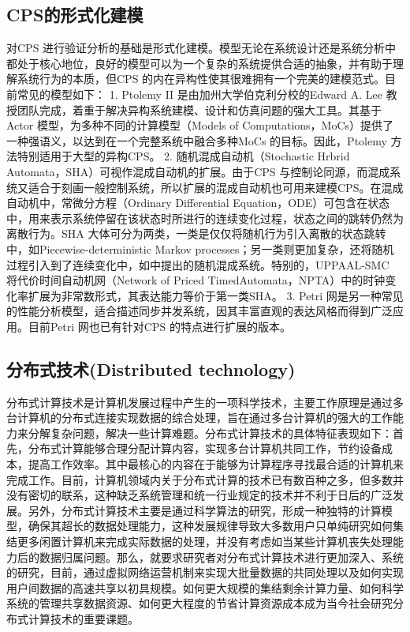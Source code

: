 \subsection{CPS的形式化建模}
对CPS 进行验证分析的基础是形式化建模。模型无论在系统设计还是系统分析中都处于核心地位，良好的模型可以为一个复杂的系统提供合适的抽象，并有助于理解系统行为的本质，但CPS 的内在异构性使其很难拥有一个完美的建模范式。目前常见的模型如下：
1.	Ptolemy II 是由加州大学伯克利分校的Edward A. Lee 教授团队完成，着重于解决异构系统建模、设计和仿真问题的强大工具。其基于Actor 模型，为多种不同的计算模型（Models of Computations，MoCs）提供了一种强语义，以达到在一个完整系统中融合多种MoCs 的目标。因此，Ptolemy 方法特别适用于大型的异构CPS。
2.	随机混成自动机（Stochastic Hrbrid Automata，SHA）可视作混成自动机的扩展。由于CPS 与控制论同源，而混成系统又适合于刻画一般控制系统，所以扩展的混成自动机也可用来建模CPS。在混成自动机中，常微分方程（Ordinary Differential Equation，ODE）可包含在状态中，用来表示系统停留在该状态时所进行的连续变化过程，状态之间的跳转仍然为离散行为。SHA 大体可分为两类，一类是仅仅将随机行为引入离散的状态跳转中，如Piecewise-deterministic Markov processes；另一类则更加复杂，还将随机过程引入到了连续变化中，如中提出的随机混成系统。特别的，UPPAAL-SMC 将代价时间自动机网（Network of Priced TimedAutomata，NPTA）中的时钟变化率扩展为非常数形式，其表达能力等价于第一类SHA。
3.	Petri 网是另一种常见的性能分析模型，适合描述同步并发系统，因其丰富直观的表达风格而得到广泛应用。目前Petri 网也已有针对CPS 的特点进行扩展的版本。


\subsection{分布式技术(Distributed technology)}
分布式计算技术是计算机发展过程中产生的一项科学技术，主要工作原理是通过多台计算机的分布式连接实现数据的综合处理，旨在通过多台计算机的强大的工作能力来分解复杂问题，解决一些计算难题。分布式计算技术的具体特征表现如下：首先，分布式计算能够合理分配计算内容，实现多台计算机共同工作，节约设备成本，提高工作效率。其中最核心的内容在于能够为计算程序寻找最合适的计算机来完成工作。目前，计算机领域内关于分布式计算的技术已有数百种之多，但多数并没有密切的联系，这种缺乏系统管理和统一行业规定的技术并不利于日后的广泛发展。另外，分布式计算技术主要是通过科学算法的研究，形成一种独特的计算模型，确保其超长的数据处理能力，这种发展规律导致大多数用户只单纯研究如何集结更多闲置计算机来完成实际数据的处理，并没有考虑如当某些计算机丧失处理能力后的数据归属问题。那么，就要求研究者对分布式计算技术进行更加深入、系统的研究，目前，通过虚拟网络运营机制来实现大批量数据的共同处理以及如何实现用户间数据的高速共享以初具规模。如何更大规模的集结剩余计算力量、如何科学系统的管理共享数据资源、如何更大程度的节省计算资源成本成为当今社会研究分布式计算技术的重要课题。


